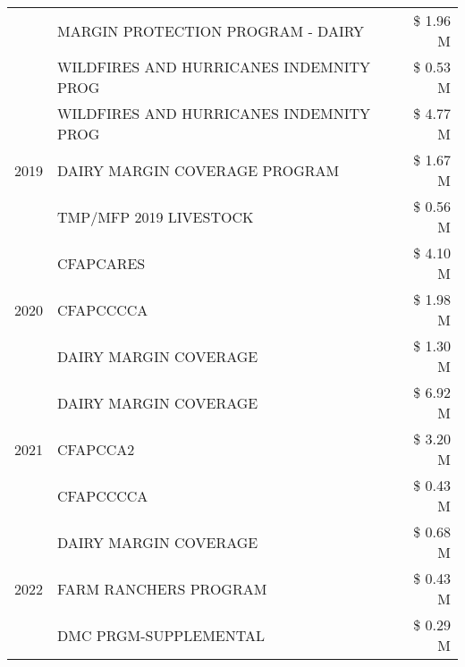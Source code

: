 \begin{tabular}{llr}
 & MARGIN PROTECTION PROGRAM - DAIRY & \$ 1.96 M \\
 & WILDFIRES AND HURRICANES INDEMNITY PROG & \$ 0.53 M \\
\cline{1-3}
\multirow[t]{3}{*}{2019} & WILDFIRES AND HURRICANES INDEMNITY PROG & \$ 4.77 M \\
 & DAIRY MARGIN COVERAGE PROGRAM & \$ 1.67 M \\
 & TMP/MFP 2019 LIVESTOCK & \$ 0.56 M \\
\cline{1-3}
\multirow[t]{3}{*}{2020} & CFAPCARES & \$ 4.10 M \\
 & CFAPCCCCA & \$ 1.98 M \\
 & DAIRY MARGIN COVERAGE & \$ 1.30 M \\
\cline{1-3}
\multirow[t]{3}{*}{2021} & DAIRY MARGIN COVERAGE & \$ 6.92 M \\
 & CFAPCCA2 & \$ 3.20 M \\
 & CFAPCCCCA & \$ 0.43 M \\
\cline{1-3}
\multirow[t]{3}{*}{2022} & DAIRY MARGIN COVERAGE & \$ 0.68 M \\
 & FARM RANCHERS PROGRAM & \$ 0.43 M \\
 & DMC PRGM-SUPPLEMENTAL & \$ 0.29 M \\
\cline{1-3}
\bottomrule
\end{tabular}
